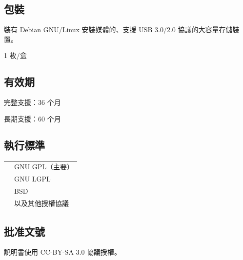 \documentclass[UTF8]{article}
\begin{document}
\begin{multicols*}{3}
	\medskip


	\begin{tcolorbox}
	\section*{包裝}
	\end{tcolorbox}

	裝有 Debian GNU/Linux 安裝媒體的、支援 USB 3.0/2.0 協議的大容量存儲裝置。

	1 枚/盒

	\medskip


	\begin{tcolorbox}
	\section*{有效期}
	\end{tcolorbox}

	完整支援：36 个月

	長期支援：60 个月

	\medskip


	\begin{tcolorbox}
	\section*{執行標準}
	\end{tcolorbox}
	\begin{tabularx}{\linewidth}{@{}ll@{}}
		\multirow{4}{*}{}{開放原始碼許可：} & GNU GPL（主要）\\
		~ & GNU LGPL \\
		~ & BSD \\
		~ & 以及其他授權協議 \\
	\end{tabularx}

	\medskip


	\begin{tcolorbox}
	\section*{批准文號}
	\end{tcolorbox}

	說明書使用 CC-BY-SA 3.0 協議授權。

	\medskip




\end{multicols*}
\end{document}
